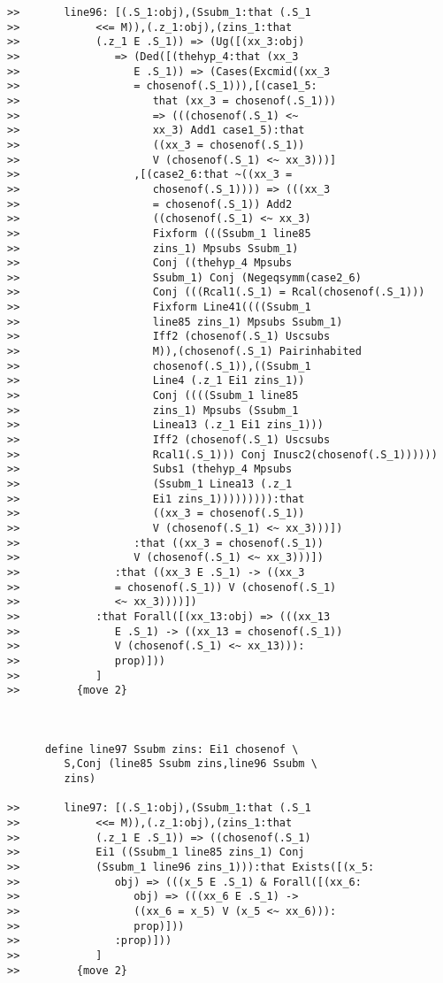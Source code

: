 \documentclass[12pt]{article}
\begin{document}
\begin{verbatim}
>>       line96: [(.S_1:obj),(Ssubm_1:that (.S_1
>>            <<= M)),(.z_1:obj),(zins_1:that
>>            (.z_1 E .S_1)) => (Ug([(xx_3:obj)
>>               => (Ded([(thehyp_4:that (xx_3
>>                  E .S_1)) => (Cases(Excmid((xx_3
>>                  = chosenof(.S_1))),[(case1_5:
>>                     that (xx_3 = chosenof(.S_1)))
>>                     => (((chosenof(.S_1) <~
>>                     xx_3) Add1 case1_5):that
>>                     ((xx_3 = chosenof(.S_1))
>>                     V (chosenof(.S_1) <~ xx_3)))]
>>                  ,[(case2_6:that ~((xx_3 =
>>                     chosenof(.S_1)))) => (((xx_3
>>                     = chosenof(.S_1)) Add2
>>                     ((chosenof(.S_1) <~ xx_3)
>>                     Fixform (((Ssubm_1 line85
>>                     zins_1) Mpsubs Ssubm_1)
>>                     Conj ((thehyp_4 Mpsubs
>>                     Ssubm_1) Conj (Negeqsymm(case2_6)
>>                     Conj (((Rcal1(.S_1) = Rcal(chosenof(.S_1)))
>>                     Fixform Line41((((Ssubm_1
>>                     line85 zins_1) Mpsubs Ssubm_1)
>>                     Iff2 (chosenof(.S_1) Uscsubs
>>                     M)),(chosenof(.S_1) Pairinhabited
>>                     chosenof(.S_1)),((Ssubm_1
>>                     Line4 (.z_1 Ei1 zins_1))
>>                     Conj ((((Ssubm_1 line85
>>                     zins_1) Mpsubs (Ssubm_1
>>                     Linea13 (.z_1 Ei1 zins_1)))
>>                     Iff2 (chosenof(.S_1) Uscsubs
>>                     Rcal1(.S_1))) Conj Inusc2(chosenof(.S_1))))))
>>                     Subs1 (thehyp_4 Mpsubs
>>                     (Ssubm_1 Linea13 (.z_1
>>                     Ei1 zins_1))))))))):that
>>                     ((xx_3 = chosenof(.S_1))
>>                     V (chosenof(.S_1) <~ xx_3)))])
>>                  :that ((xx_3 = chosenof(.S_1))
>>                  V (chosenof(.S_1) <~ xx_3)))])
>>               :that ((xx_3 E .S_1) -> ((xx_3
>>               = chosenof(.S_1)) V (chosenof(.S_1)
>>               <~ xx_3))))])
>>            :that Forall([(xx_13:obj) => (((xx_13
>>               E .S_1) -> ((xx_13 = chosenof(.S_1))
>>               V (chosenof(.S_1) <~ xx_13))):
>>               prop)]))
>>            ]
>>         {move 2}



      define line97 Ssubm zins: Ei1 chosenof \
         S,Conj (line85 Ssubm zins,line96 Ssubm \
         zins)

>>       line97: [(.S_1:obj),(Ssubm_1:that (.S_1
>>            <<= M)),(.z_1:obj),(zins_1:that
>>            (.z_1 E .S_1)) => ((chosenof(.S_1)
>>            Ei1 ((Ssubm_1 line85 zins_1) Conj
>>            (Ssubm_1 line96 zins_1))):that Exists([(x_5:
>>               obj) => (((x_5 E .S_1) & Forall([(xx_6:
>>                  obj) => (((xx_6 E .S_1) ->
>>                  ((xx_6 = x_5) V (x_5 <~ xx_6))):
>>                  prop)]))
>>               :prop)]))
>>            ]
>>         {move 2}




\end{verbatim}
\end{document}
